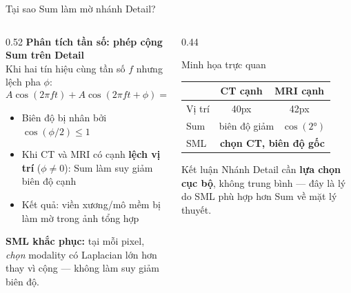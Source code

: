 \documentclass[t, aspectratio=169]{beamer}
\begin{document}
\begin{frame}{Tại sao Sum làm mờ nhánh Detail?}
    \begin{columns}[T]
        \begin{column}{0.52\textwidth}
            \textbf{Phân tích tần số: phép cộng Sum trên Detail}\\[4pt]
            Khi hai tín hiệu cùng tần số $f$ nhưng lệch pha $\phi$:
            \[
              A\cos(2\pi f t) + A\cos(2\pi f t + \phi) = 2A\cos\!\tfrac{\phi}{2}\cdot\cos\!\bigl(2\pi f t + \tfrac{\phi}{2}\bigr)
            \]
            \vspace{-0.2em}
            \begin{itemize}\itemsep1pt\small
                \item Biên độ bị nhân bởi $\cos(\phi/2) \leq 1$
                \item Khi CT và MRI có cạnh \textbf{lệch vị trí} ($\phi \neq 0$): Sum làm \alert{suy giảm biên độ cạnh}
                \item Kết quả: viền xương/mô mềm bị làm mờ trong ảnh tổng hợp
            \end{itemize}
            \vspace{0.4em}
            \textbf{SML khắc phục:} tại mỗi pixel, \emph{chọn} modality có Laplacian lớn hơn thay vì cộng --- không làm suy giảm biên độ.
        \end{column}
        \begin{column}{0.44\textwidth}
            \begin{alertblock}{Minh họa trực quan}
                \small
                \begin{tabular}{lcc}
                    & \textbf{CT cạnh} & \textbf{MRI cạnh} \\
                    \midrule
                    Vị trí & 40px & 42px \\
                    Sum & \multicolumn{2}{c}{\alert{biên độ giảm ~$\cos(2°)$}} \\
                    SML & \multicolumn{2}{c}{\textbf{chọn CT, biên độ gốc}} \\
                \end{tabular}
            \end{alertblock}
            \vspace{0.4em}
            \begin{block}{\small Kết luận}
                \small Nhánh Detail cần \textbf{lựa chọn cục bộ}, không trung bình --- đây là lý do SML phù hợp hơn Sum về mặt lý thuyết.
            \end{block}
        \end{column}
    \end{columns}
\end{frame}
\end{document}
